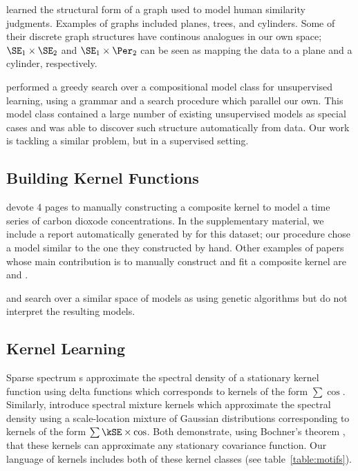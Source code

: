 \citet{kemp2008discovery} learned the structural form of a graph used to model human similarity judgments.
Examples of graphs included planes, trees, and cylinders.
Some of their discrete graph structures have continous analogues in our own space; \eg $\SE_1 \times \SE_2$ and $\SE_1 \times \Per_2$ can be seen as mapping the data to a plane and a cylinder, respectively.

\citet{grosse2012exploiting} performed a greedy search over a compositional model class for unsupervised learning, using a grammar and a search procedure which parallel our own. This model class contained a large number of existing unsupervised models as special cases and was able to discover such structure automatically from data. Our work is tackling a similar problem, but in a supervised setting.


\subsection{Building Kernel Functions}
\cite{rasmussen38gaussian} devote 4 pages to manually constructing a composite kernel to model a time series of carbon dioxode concentrations.
In the supplementary material, we include a report automatically generated by \procedurename{} for this dataset; our procedure chose a model similar to the one they constructed by hand.
Other examples of papers whose main contribution is to manually construct and fit a composite \gp{} kernel are \cite{klenske2012nonparametric} and \cite{lloydgefcom2012}.

\citet{diosan2007evolving, bing2010gp} and \citet{kronberger2013evolution} search over a similar space of models as \procedurename{} using genetic algorithms but do not interpret the resulting models.

\subsection{Kernel Learning}

Sparse spectrum \gp{}s \citep{lazaro2010sparse} approximate the spectral density of a stationary kernel function using delta functions which corresponds to kernels of the form $\sum \cos$.
Similarly, \citet{WilAda13} introduce spectral mixture kernels which approximate the spectral density using a scale-location mixture of Gaussian distributions corresponding to kernels of the form $\sum \kSE \times \cos$.
Both demonstrate, using Bochner's theorem \citep{bochner1959lectures}, that these kernels can approximate any stationary covariance function.
Our language of kernels includes both of these kernel classes (see table~\ref{table:motifs}).

